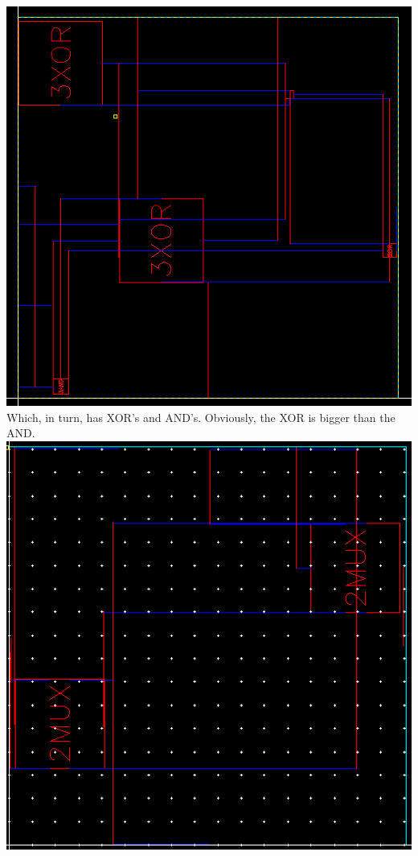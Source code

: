 \documentclass[12pt]{article}
\begin{document}
  \includegraphics[scale=0.5]{adderlayout.png} \\
  \newline \newline
  Which, in turn, has XOR's and AND's. Obviously, the XOR is bigger than the AND.
  \newline \newline
  \includegraphics[scale=0.5]{shiftlayout.png} \\
\end{document}
